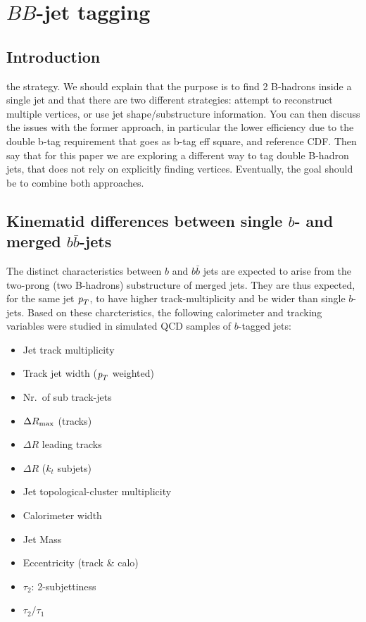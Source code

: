 %
%
\chapter{$BB$-jet tagging}

\section{Introduction}\label{sec:gbbintro}

the strategy. We should explain that the purpose is to find 2 B-hadrons inside a single jet and that there are two different strategies: attempt to reconstruct multiple vertices, or use jet shape/substructure information. You can then discuss the issues with the former approach, in particular the lower efficiency due to the double b-tag requirement that goes as b-tag eff square, and reference CDF. Then say that for this paper we are exploring a different way to tag double B-hadron jets, that does not rely on explicitly finding vertices. Eventually, the goal should be to combine both approaches.


\section{Kinematid differences between single $b$- and merged $b\bar{b}$-jets}\label{sec:gbbKine}
The distinct characteristics between $b$ and $b \bar{b}$ jets are expected to arise from the two-prong (two B-hadrons) substructure of merged jets.  They are thus expected, for the same jet ${\emph{p}_{T}}$, to have higher track-multiplicity and be wider than single $b$-jets. Based on these charcteristics, the following calorimeter and tracking variables were studied in simulated QCD samples of $b$-tagged jets:

\begin{itemize}\addtolength{\itemsep}{-0.4\baselineskip}
\item
Jet track multiplicity
\item
Track jet width (${\emph{p}_{T}}$ weighted)
\item
Nr.\ of sub track-jets
\item
$\Delta R_{\rm max}$ (tracks)
\item
$\Delta R$ leading tracks
\item
$\Delta R$ ($k_t$ subjets)
\item
Jet topological-cluster multiplicity
\item
Calorimeter width
\item 
Jet Mass
\item 
Eccentricity (track \& calo)
\item
$\tau_2$: 2-subjettiness 
\item
$\tau_2/\tau_1$
\end{itemize}




